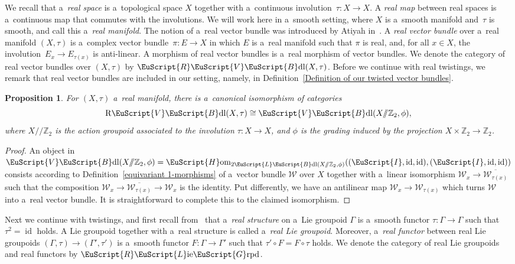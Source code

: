 \documentclass[10pt,a4paper]{amsart}
\numberwithin{equation}{section}
\newtheorem{Proposition}[Theorem]{Proposition}
 { \theoremstyle{definition}
\newtheorem{Definition}[Theorem]{Definition}
\newtheorem{Example}[Theorem]{Example}
\newtheorem{Remark}[Theorem]{Remark} }
\def\mathscr#1{\EuScript{#1}}
\def\Z {\mathbb{Z}}
\def\liegrpd{\mathscr{L}\text{ie}\mathscr{G}\text{rpd}}
\def\act#1#2{#1/\!\!/#2}
\newcommand{\id}{\operatorname{id}}
\newcommand{\Hom}{\mathscr{H}\mathrm{om}}
\newcommand{\VectBdl}{\mathscr{V}\mathscr{B}\mathrm{dl}}
\newcommand{\LineBdl}{\mathscr{L}\mathscr{B}\mathrm{dl}}
\newcommand{\twoLineBdl}{2\LineBdl}
\def\Rliegrpd{\normalfont\mathscr{R}\liegrpd}
\def\RVectBdl{\mathscr{R}\VectBdl}
\begin{document}
We recall that a~\emph{real space} is a~topological space $X$ together with a~continuous involution~${\tau \colon X \to X}$. A \emph{real map} between real spaces is a~continuous map that commutes with the involutions.
We will work here in a~smooth setting, where $X$ is a~smooth manifold and~$\tau$ is smooth, and call this a~\emph{real manifold}.
The notion of a~real vector bundle was introduced by Atiyah in~\cite{Atiyah1966Reality}. A \emph{real vector bundle} over a~real manifold $(X,\tau)$ is a~complex vector bundle~${\pi \colon E \to X}$ in which $E$ is a~real manifold such that $\pi$ is real, and, for all $x \in X$, the involution~${E_x \to E_{\tau(x)}}$ is anti-linear.
A morphism of real vector bundles is a~real morphism of vector bundles.
We denote the category of real vector bundles over $(X,\tau)$ by $\RVectBdl(X,\tau)$. Before we continue with real twistings, we remark that real vector bundles are included in our setting, namely, in Definition~\ref{Definition of our twisted vector bundles}.
\begin{Proposition}
For $(X,\tau)$ a~real manifold, there is a~canonical isomorphism of categories
\begin{equation*}
\mathrm{R}\VectBdl(X,\tau) \cong \VectBdl(\act X\Z_2,\phi),
\end{equation*}
where $\act X\Z_2$ is the action groupoid
associated to the involution $\tau \colon X \to X$, and $\phi$ is the grading induced by the projection $X \times \Z_2 \to \Z_2$.
\end{Proposition}
\begin{proof}
 An object in $\VectBdl(\act X\Z_2,\phi)=\Hom_{\twoLineBdl(\act X\Z_2,\phi)}((\mathscr{I},\id,\id), (\mathscr{I},\id,\id))$ consists according to Definition~\ref{equivariant 1-morphisms} of a~vector bundle $\mathcal{W}$ over $X$ together with a~linear isomorphism
 $\mathcal{W}_x \to \overline{\mathcal{W}_{\tau(x)}}$ such that the composition $\mathcal{W}_x \to \overline{\mathcal{W}_{\tau(x)}} \to \mathcal{W}_x$ is the identity. Put differently, we have an antilinear
 map $\mathcal{W}_x \to \mathcal{W}_{\tau(x)}$ which turns $\mathcal{W}$ into a~real vector bundle. It is straightforward to complete this to the claimed isomorphism.
\end{proof}


Next we continue with twistings, and first recall from~\cite{mohamedmoutuou2012} that a~\emph{real structure} on a~Lie groupoid $\Gamma$ is a~smooth functor $\tau \colon \Gamma \to \Gamma$ such that
$\tau^2 = \id$ holds. A Lie groupoid together with a~real structure is called a~\emph{real Lie groupoid}.
Moreover, a~\emph{real functor} between real Lie groupoids $(\Gamma,\tau) \to (\Gamma',\tau')$ is a~smooth functor $F \colon \Gamma \to \Gamma'$ such that
$\tau' \circ F = F \circ \tau$ holds. We denote the category of real Lie groupoids and real functors by $\Rliegrpd$.
\end{document}
